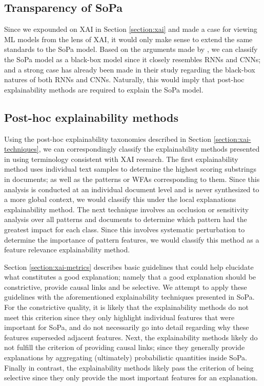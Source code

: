 \subsection{Transparency of SoPa}

\label{section:sopa-transparency}

Since we expounded on XAI in Section \ref{section:xai} and made a case for viewing ML models from the lens of XAI, it would only make sense to extend the same standards to the SoPa model. Based on the arguments made by \citet{arrieta2020explainable}, we can classify the SoPa model as a black-box model since it closely resembles RNNs and CNNs; and a strong case has already been made in their study regarding the black-box natures of both RNNs and CNNs. Naturally, this would imply that post-hoc explainability methods are required to explain the SoPa model. 

\subsection{Post-hoc explainability methods}

\label{section:sopa-explainability}

Using the post-hoc explainability taxonomies described in Section \ref{section:xai-techniques}, we can correspondingly classify the explainability methods presented in \citet{schwartz2018sopa} using terminology consistent with XAI research. The first explainability method uses individual text samples to determine the highest scoring substrings in documents; as well as the patterns or WFAs corresponding to them. Since this analysis is conducted at an individual document level and is never synthesized to a more global context, we would classify this under the local explanations explainability method. The next technique involves an occlusion or sensitivity analysis over all patterns and documents to determine which pattern had the greatest impact for each class. Since this involves systematic perturbation to determine the importance of pattern features, we would classify this method as a feature relevance explainability method.

Section \ref{section:xai-metrics} describes basic guidelines that could help elucidate what constitutes a good explanation; namely that a good explanation should be constrictive, provide causal links and be selective. We attempt to apply these guidelines with the aforementioned explainability techniques presented in SoPa. For the constrictive quality, it is likely that the explainability methods do not meet this criterion since they only highlight individual features that were important for SoPa, and do not necessarily go into detail regarding why these features superseded adjacent features. Next, the explainability methods likely do not fulfill the criterion of providing causal links; since they generally provide explanations by aggregating (ultimately) probabilistic quantities inside SoPa. Finally in contrast, the explainability methods likely pass the criterion of being selective since they only provide the most important features for an explanation. 

